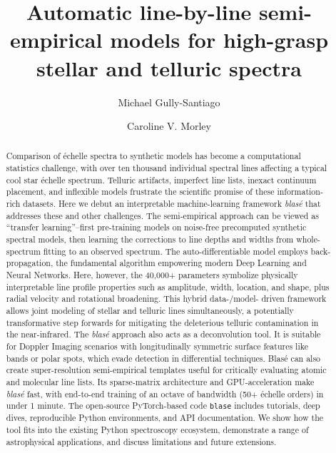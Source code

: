 \documentclass[twocolumn]{aastex631}
\begin{document}
\title{Automatic line-by-line semi-empirical models for high-grasp stellar and telluric spectra}

\author{Michael Gully-Santiago}

\author{Caroline V. Morley}

\begin{abstract}

    Comparison of \'echelle spectra to synthetic models has become a computational statistics challenge, with over ten thousand individual spectral lines affecting a typical cool star \'echelle spectrum.  Telluric artifacts, imperfect line lists, inexact continuum placement, and inflexible models frustrate the scientific promise of these information-rich datasets.  Here we debut an interpretable machine-learning framework \emph{blas\'e} that addresses these and other challenges.  The semi-empirical approach can be viewed as ``transfer learning''--first pre-training models on noise-free precomputed synthetic spectral models, then learning the corrections to line depths and widths from whole-spectrum fitting to an observed spectrum.  The auto-differentiable model employs back-propagation, the fundamental algorithm empowering modern Deep Learning and Neural Networks. Here, however, the 40,000+ parameters symbolize physically interpretable line profile properties such as amplitude, width, location, and shape, plus radial velocity and rotational broadening.  This hybrid data-/model- driven framework allows joint modeling of stellar and telluric lines simultaneously, a potentially transformative step forwards for mitigating the deleterious telluric contamination in the near-infrared.  The \emph{blas\'e} approach also acts as a deconvolution tool. It is suitable for Doppler Imaging scenarios with longitudinally symmetric surface features like bands or polar spots, which evade detection in differential techniques.  Blas\'e can also create super-resolution semi-empirical templates useful for critically evaluating atomic and molecular line lists.  Its sparse-matrix architecture and GPU-acceleration make \emph{blas\'e} fast, with end-to-end training of an octave of bandwidth (50+ \'echelle orders) in under 1 minute.  The open-source PyTorch-based code \texttt{blase} includes tutorials, deep dives, reproducible Python environments, and API documentation.  We show how the tool fits into the existing Python spectroscopy ecosystem, demonstrate a range of astrophysical applications, and discuss limitations and future extensions.


\end{abstract}
\end{document}
